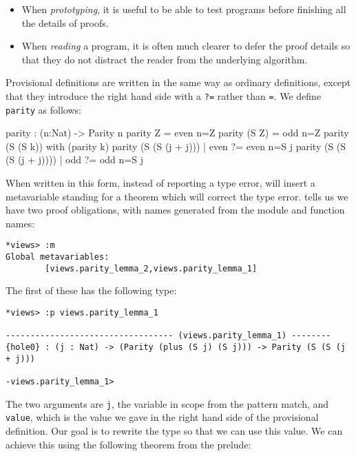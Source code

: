 \begin{itemize}
\item When \emph{prototyping}, it is useful to be able to test programs before finishing all the details of proofs.  
\item When \emph{reading} a program, it is often much clearer to defer the proof details so that they do not distract the reader from the underlying algorithm.
\end{itemize}

\noindent
Provisional definitions are written in the same way as ordinary definitions, except that they introduce the right hand side with a \texttt{?=} rather than \texttt{=}.
We define \texttt{parity} as follows:

\begin{code}
parity : (n:Nat) -> Parity n
parity Z     = even {n=Z}
parity (S Z) = odd {n=Z}
parity (S (S k)) with (parity k)
  parity (S (S (j + j)))     | even ?= even {n=S j}
  parity (S (S (S (j + j)))) | odd  ?= odd {n=S j}
\end{code}

\noindent
When written in this form, instead of reporting a type error, \Idris{} will insert a metavariable standing for a theorem which will correct the type error.
\Idris{} tells us we have two proof obligations, with names generated from the module and function names:

\begin{lstlisting}[style=stdout]
*views> :m 
Global metavariables:
        [views.parity_lemma_2,views.parity_lemma_1]
\end{lstlisting}

\noindent
The first of these has the following type:

\begin{lstlisting}[style=stdout]
*views> :p views.parity_lemma_1 

---------------------------------- (views.parity_lemma_1) --------
{hole0} : (j : Nat) -> (Parity (plus (S j) (S j))) -> Parity (S (S (j + j)))

-views.parity_lemma_1>  
\end{lstlisting}

\noindent
The two arguments are \texttt{j}, the variable in scope from the pattern match, and \texttt{value}, which is the value we gave in the right hand side of the provisional definition.
Our goal is to rewrite the type so that we can use this value.
We can achieve this using the following theorem from the prelude:

